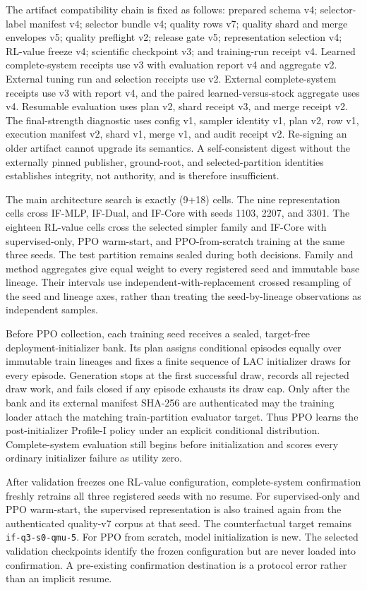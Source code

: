 \documentclass[10pt,a4paper]{article}
\begin{document}
The artifact compatibility chain is fixed as follows: prepared schema
v4; selector-label manifest v4; selector bundle v4; quality rows v7;
quality shard and merge envelopes v5; quality preflight v2; release gate
v5; representation selection v4; RL-value freeze v4; scientific
checkpoint v3; and training-run receipt v4. Learned complete-system
receipts use v3 with evaluation report v4 and aggregate v2. External
tuning run and selection receipts use v2. External complete-system
receipts use v3 with report v4, and the paired learned-versus-stock
aggregate uses v4. Resumable evaluation uses plan v2, shard receipt v3,
and merge receipt v2. The final-strength diagnostic uses config v1,
sampler identity v1, plan v2, row v1, execution manifest v2, shard v1,
merge v1, and audit receipt v2. Re-signing an older artifact cannot
upgrade its semantics. A self-consistent digest without the externally
pinned publisher, ground-root, and selected-partition identities
establishes integrity, not authority, and is therefore insufficient.

The main architecture search is exactly (9+18) cells. The nine
representation cells cross IF-MLP, IF-Dual, and IF-Core with seeds 1103,
2207, and 3301. The eighteen RL-value cells cross the selected simpler
family and IF-Core with supervised-only, PPO warm-start, and
PPO-from-scratch training at the same three seeds. The test partition
remains sealed during both decisions. Family and method aggregates give
equal weight to every registered seed and immutable base lineage. Their
intervals use independent-with-replacement crossed resampling of the
seed and lineage axes, rather than treating the seed-by-lineage
observations as independent samples.

Before PPO collection, each training seed receives a sealed,
target-free deployment-initializer bank. Its plan assigns conditional
episodes equally over immutable train lineages and fixes a finite
sequence of LAC initializer draws for every episode. Generation stops at
the first successful draw, records all rejected draw work, and fails
closed if any episode exhausts its draw cap. Only after the bank and its
external manifest SHA-256 are authenticated may the training loader
attach the matching train-partition evaluator target. Thus PPO learns
the post-initializer Profile-I policy under an explicit conditional
distribution. Complete-system evaluation still begins before
initialization and scores every ordinary initializer failure as utility
zero.

After validation freezes one RL-value configuration, complete-system
confirmation freshly retrains all three registered seeds with no resume.
For supervised-only and PPO warm-start, the supervised representation is
also trained again from the authenticated quality-v7 corpus at that
seed. The counterfactual target remains
\texttt{if-q3-s0-qmu-5}. For PPO from scratch, model initialization is new. The selected
validation checkpoints identify the frozen configuration but are never
loaded into confirmation. A pre-existing confirmation destination is a
protocol error rather than an implicit resume.
\end{document}
